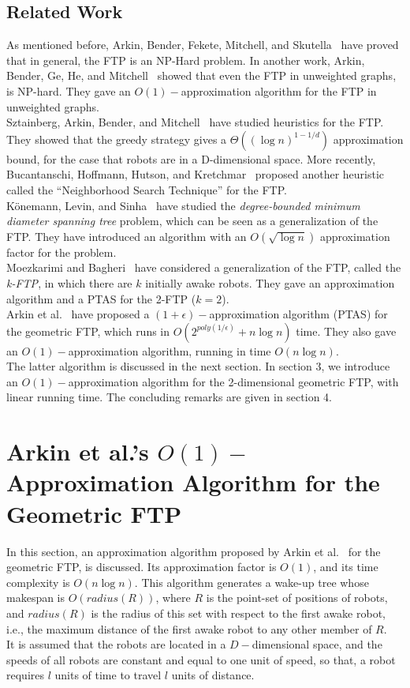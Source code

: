 \documentclass[review]{elsarticle}
\begin{document}
\subsection{Related Work}
As mentioned before, Arkin, Bender, Fekete, Mitchell, and Skutella~\cite{Arkin2006} have proved that in general, the FTP is an NP-Hard problem. In another work, Arkin, Bender, Ge, He, and Mitchell~\cite{Arkin2003} showed that even the FTP in unweighted graphs, is NP-hard. They gave an $O(1)-$approximation algorithm for the FTP in unweighted graphs.\\
Sztainberg, Arkin, Bender, and Mitchell~\cite{sztainberg2004} have studied heuristics for the FTP. They showed that the greedy strategy gives a $\Theta((\log n)^{1-1/d})$ approximation bound, for the case that robots are in a D-dimensional space. More recently, Bucantanschi, Hoffmann, Hutson, and Kretchmar~\cite{Bucantanschi2007} proposed another heuristic called the ``Neighborhood Search Technique'' for the FTP.\\
Könemann, Levin, and Sinha~\cite{Konemann2004} have studied the \textit{degree-bounded minimum diameter spanning tree} problem, which can be seen as a generalization of the FTP. They have introduced an algorithm with an $O(\sqrt{\log n})$ approximation factor for the problem.\\
Moezkarimi and Bagheri~\cite{Moezkarimi2014} have considered a generalization of the FTP, called the \textit{k-FTP}, in which there are $k$ initially awake robots. They gave an approximation algorithm and a PTAS for the 2-FTP ($k=2$).\\
Arkin et al.~\cite{Arkin2006} have proposed a $(1+\epsilon)-$approximation algorithm (PTAS) for the geometric FTP, which runs in $O(2^{poly(1/\epsilon)}+n\log n)$ time. They also gave an $O(1)-$approximation algorithm, running in time $O(n\log n)$.\\
The latter algorithm is discussed in the next section. In section 3, we introduce an $O(1)-$approximation algorithm for the 2-dimensional geometric FTP, with linear running time. The concluding remarks are given in section 4.

\section{Arkin et al.'s $O(1)-$Approximation Algorithm for the Geometric FTP}
In this section, an approximation algorithm proposed by Arkin et al.~\cite{Arkin2006} for the geometric FTP, is discussed. Its approximation factor is $O(1)$, and its time complexity is $O(n\log n)$. This algorithm generates a wake-up tree whose makespan is $O(radius(R))$, where $R$ is the point-set of positions of robots, and $radius(R)$ is the radius of this set with respect to the first awake robot, i.e., the maximum distance of the first awake robot to any other member of $R$.\\
It is assumed that the robots are located in a $D-$dimensional space, and the speeds of all robots are constant and equal to one unit of speed, so that, a robot requires $l$ units of time to travel $l$ units of distance.
\end{document}

